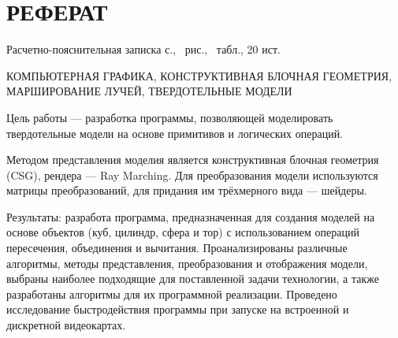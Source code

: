 \section*{РЕФЕРАТ}

Расчетно-пояснительная записка \pageref{LastPage} с., \totalfigures\ рис., \totaltables\ табл., 20 ист.

КОМПЬЮТЕРНАЯ ГРАФИКА, КОНСТРУКТИВНАЯ БЛОЧНАЯ ГЕОМЕТРИЯ, МАРШИРОВАНИЕ ЛУЧЕЙ, ТВЕРДОТЕЛЬНЫЕ МОДЕЛИ

Цель работы --- разработка программы, позволяющей моделировать твердотельные модели на основе примитивов и логических операций.

Методом представления моделия является  конструктивная  блочная геометрия  (CSG),
рендера  ---  Ray Marching.
Для  преобразования  модели  используются
матрицы преобразований, для придания им трёхмерного вида --- шейдеры.

Результаты: разработа программа, предназначенная для создания моделей на основе объектов (куб, цилиндр, сфера и тор) с использованием операций пересечения, объединения и
вычитания.
Проанализированы  различные  алгоритмы,  методы  представления,
преобразования  и  отображения  модели,  выбраны  наиболее  подходящие  для поставленной  задачи  технологии,  а  также  разработаны  алгоритмы  для  их
программной реализации.
Проведено исследование быстродействия программы при запуске на встроенной и дискретной видеокартах.

\pagebreak